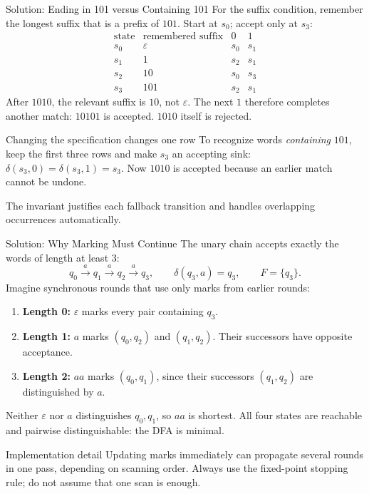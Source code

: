 \documentclass[10pt]{beamer}
\begin{document}
\begin{frame}{Solution: Ending in 101 versus Containing 101}
  \small
  For the suffix condition, remember the longest suffix that is a prefix
  of $101$. Start at $s_0$; accept only at $s_3$:
  \[
    \begin{array}{c|c|cc}
      \text{state}&\text{remembered suffix}&0&1\\\hline
      s_0&\varepsilon&s_0&s_1\\
      s_1&1&s_2&s_1\\
      s_2&10&s_0&s_3\\
      s_3&101&s_2&s_1
    \end{array}
  \]
  \pause
  After $1010$, the relevant suffix is $10$, not $\varepsilon$.
  The next $1$ therefore completes another match: $10101$ is accepted.
  $1010$ itself is rejected.
  \pause
  \begin{block}{Changing the specification changes one row}
    To recognize words \emph{containing} $101$, keep the first three rows
    and make $s_3$ an accepting sink: $\delta(s_3,0)=\delta(s_3,1)=s_3$.
    Now $1010$ is accepted because an earlier match cannot be undone.
  \end{block}
  The invariant justifies each fallback transition and handles overlapping
  occurrences automatically.
\end{frame}

\begin{frame}{Solution: Why Marking Must Continue}
  \small
  The unary chain accepts exactly the words of length at least $3$:
  \[
    q_0\xrightarrow{a}q_1\xrightarrow{a}q_2\xrightarrow{a}q_3,
    \qquad\delta(q_3,a)=q_3,\qquad F=\{q_3\}.
  \]
  Imagine synchronous rounds that use only marks from earlier rounds:
  \begin{enumerate}
    \item \textbf{Length 0:} $\varepsilon$ marks every pair containing $q_3$.
    \pause
    \item \textbf{Length 1:} $a$ marks $(q_0,q_2)$ and $(q_1,q_2)$.
      Their successors have opposite acceptance.
    \pause
    \item \textbf{Length 2:} $aa$ marks $(q_0,q_1)$, since their successors
      $(q_1,q_2)$ are distinguished by $a$.
  \end{enumerate}
  \pause
  Neither $\varepsilon$ nor $a$ distinguishes $q_0,q_1$, so $aa$ is shortest.
  All four states are reachable and pairwise distinguishable: the DFA is minimal.
  \begin{alertblock}{Implementation detail}
    Updating marks immediately can propagate several rounds in one pass,
    depending on scanning order. Always use the fixed-point stopping rule;
    do not assume that one scan is enough.
  \end{alertblock}
\end{frame}
\end{document}
